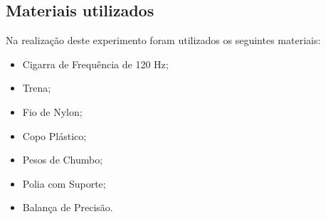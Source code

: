 \documentclass[12pt,a4paper]{article}
\begin{document}
\subsection{Materiais utilizados}
Na realização deste experimento foram utilizados os seguintes materiais:
\begin{itemize}
	\item Cigarra de Frequência de 120 Hz;
	\item Trena;
	\item Fio de Nylon;
	\item Copo Plástico;
	\item Pesos de Chumbo;
	\item Polia com Suporte;
	\item Balança de Precisão.
\end{itemize}
\end{document}
